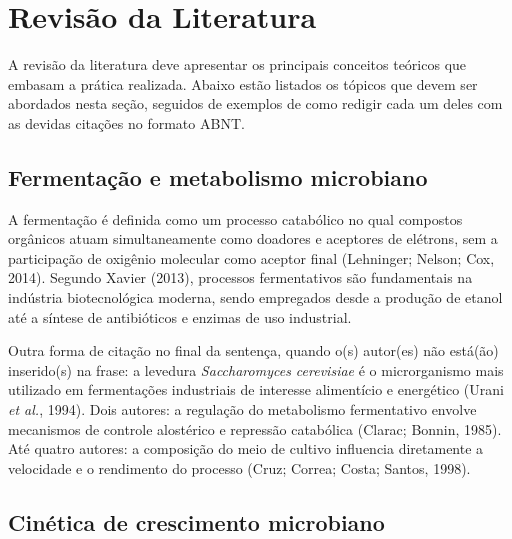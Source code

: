 %

\section{Revisão da Literatura}

A revisão da literatura deve apresentar os principais conceitos teóricos que embasam a prática realizada. Abaixo estão listados os tópicos que devem ser abordados nesta seção, seguidos de exemplos de como redigir cada um deles com as devidas citações no formato ABNT.

\subsection{Fermentação e metabolismo microbiano}

A fermentação é definida como um processo catabólico no qual compostos orgânicos atuam simultaneamente como doadores e aceptores de elétrons, sem a participação de oxigênio molecular como aceptor final (Lehninger; Nelson; Cox, 2014). Segundo Xavier (2013), processos fermentativos são fundamentais na indústria biotecnológica moderna, sendo empregados desde a produção de etanol até a síntese de antibióticos e enzimas de uso industrial.

Outra forma de citação no final da sentença, quando o(s) autor(es) não está(ão) inserido(s) na frase: a levedura \textit{Saccharomyces cerevisiae} é o microrganismo mais utilizado em fermentações industriais de interesse alimentício e energético (Urani \textit{et al.}, 1994). Dois autores: a regulação do metabolismo fermentativo envolve mecanismos de controle alostérico e repressão catabólica (Clarac; Bonnin, 1985). Até quatro autores: a composição do meio de cultivo influencia diretamente a velocidade e o rendimento do processo (Cruz; Correa; Costa; Santos, 1998).

\subsection{Cinética de crescimento microbiano}

